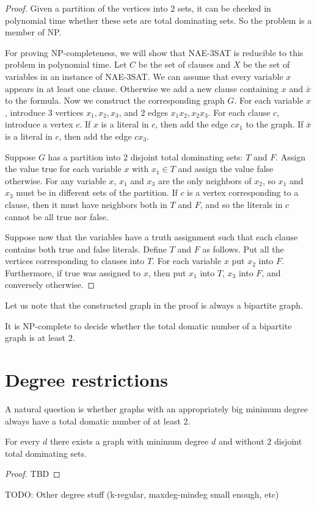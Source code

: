 \begin{proof}
  Given a partition of the vertices into $2$ sets, it can be checked in polynomial
  time whether these sets are total dominating sets. So the problem is a member
  of NP.

  For proving NP-completeness, we will show that NAE-3SAT is reducible to this problem
  in polynomial time. Let $C$ be the set of clauses and $X$ be the set of variables
  in an instance of NAE-3SAT. We can assume that every variable $x$ appears in at least
  one clause. Otherwise we add a new clause containing $x$ and $\bar{x}$ to
  the formula. Now we construct the corresponding graph $G$. For each variable $x$,
  introduce $3$ vertices $x_1, x_2, x_3$, and $2$ edges $x_1x_2, x_2x_3$. For each
  clause $c$, introduce a vertex $c$. If $x$ is a literal in $c$, then add the edge
  $cx_1$ to the graph. If $\bar{x}$ is a literal in $c$, then add the edge $cx_3$.

  Suppose $G$ has a partition into $2$ disjoint total dominating sets: $T$ and $F$.
  Assign the value true for each variable $x$ with $x_1 \in T$ and assign the value
  false otherwise. For any variable $x$, $x_1$ and $x_3$ are the only neighbors
  of $x_2$, so $x_1$ and $x_3$ must be in different sets of the partition. If $c$
  is a vertex corresponding to a clause, then it must have neighbors both in $T$
  and $F$, and so the literals in $c$ cannot be all true nor false.

  Suppose now that the variables have a truth assignment such that each clause
  contains both true and false literals. Define $T$ and $F$ as follows. Put all
  the vertices corresponding to clauses into $T$. For each variable $x$ put $x_2$
  into $F$. Furthermore, if true was assigned to $x$, then put $x_1$ into $T$, $x_3$
  into $F$, and conversely otherwise.
\end{proof}

Let us note that the constructed graph in the proof is always a bipartite
graph.

\begin{cor}
  It is NP-complete to decide whether the total domatic number of
  a bipartite graph is at least $2$.
\end{cor}

\section{Degree restrictions}

A natural question is whether graphs with an appropriately big minimum degree
always have a total domatic number of at least $2$.

\begin{thm}
  For every $d$ there exists a graph with minimum degree $d$ and without $2$
  disjoint total dominating sets.
\end{thm}
\begin{proof}
  TBD
\end{proof}

TODO: Other degree stuff (k-regular, maxdeg-mindeg small enough, etc)
